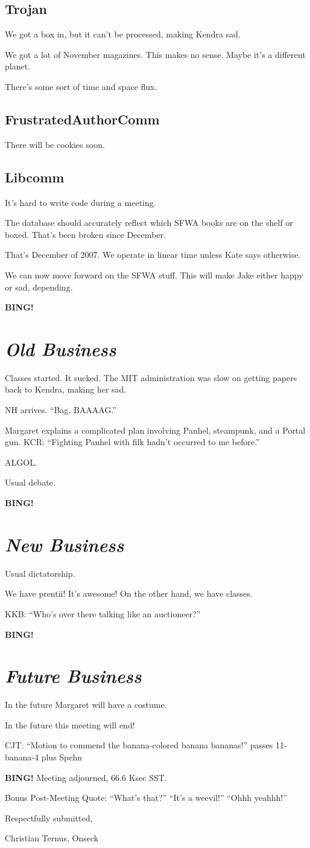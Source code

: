 \documentclass[10pt]{article}
\newcommand{\bing}{{\bf BING!} }
\newcommand{\goto}[1]{\bing \vskip 12pt \section*{{\em{#1}}}}
\newcommand{\ps}{ plus Spehn\xspace}
\begin{document}
\subsection*{Trojan}

We got a box in, but it can't be processed, making Kendra sad.

We got a lot of November magazines.  This makes no sense.  Maybe it's
a different planet.

There's some sort of time and space flux.

\subsection*{FrustratedAuthorComm}

There will be cookies soon.

\subsection*{Libcomm}

It's hard to write code during a meeting.

The database should accurately reflect which SFWA books are on the
shelf or boxed.  That's been broken since December.

That's December of 2007.  We operate in linear time unless Kate says
otherwise.  

We can now move forward on the SFWA stuff.  This will make Jake either
happy or sad, depending.

\goto{Old Business}

Classes started.  It sucked.  The MIT administration was slow on
getting papers back to Kendra, making her sad.

NH arrives.  ``Bag.  BAAAAG.''

Margaret explains a complicated plan involving Panhel, steampunk, and
a Portal gun.  KCR: ``Fighting Panhel with filk hadn't occurred to me
before.''

ALGOL.

Usual debate.

\goto{New Business}

Usual dictatorship.

We have prentii!  It's awesome!  On the other hand, we have classes.

KKB: ``Who's over there talking like an auctioneer?''

\goto{Future Business}

In the future Margaret will have a costume.

In the future this meeting will end!

CJT: ``Motion to commend the banana-colored banana bananas!'' passes 11-banana-4 \ps

\bing
\noindent
Meeting adjourned, 66.6 Ksec SST.

Bonus Post-Meeting Quote: ``What's that?'' ``It's a weevil!'' ``Ohhh yeahhh!''

\vspace{18pt}

\centerline{Respectfully submitted,}
\centerline{Christian Ternus, Onseck}
\end{document}
